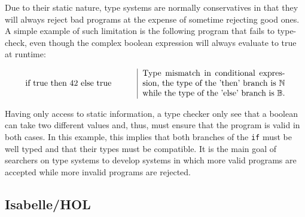 Due to their static nature, type systems are normally conservatives in that they will always reject
bad programs at the expense of sometime rejecting good ones. A simple example of such limitation is
the following program that fails to type-check, even though the complex boolean expression will
always evaluate to true at runtime:

\begin{displaymath}
  \begin{tabular}{m{4.5cm} | m{6cm}}
    if true then 42 else true
    & Type mismatch in conditional expression, the type of the 'then' branch is $\mathbb{N}$ while
    the type of the 'else' branch is $\mathbb{B}$.
  \end{tabular}
\end{displaymath}

Having only access to static information, a type checker only see that a boolean can take two
different values and, thus, must ensure that the program is valid in both cases. In this example,
this implies that both branches of the \texttt{if} must be well typed and that their types must be
compatible. It is the main goal of searchers on type systems to develop systems in which more valid
programs are accepted while more invalid programs are rejected.

\subsection{Isabelle/HOL}


